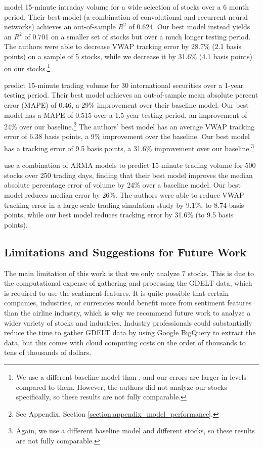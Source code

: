 \documentclass[12pt]{article}
\begin{document}
\textcite{cucuringu2025forecasting} model 15-minute intraday volume for a wide selection of stocks over a 6 month period. Their best model (a combination of convolutional and recurrent neural networks) achieves an out-of-sample $R^2$ of 0.624. Our best model instead yields an $R^2$ of 0.701 on a smaller set of stocks but over a much longer testing period. The authors were able to decrease VWAP tracking error by 28.7\% (2.1 basis points) on a sample of 5 stocks, while we decrease it by 31.6\% (4.1 basis points) on our stocks.\footnote{We use a different baseline model than \textcite{cucuringu2025forecasting}, and our errors are larger in levels compared to them. However, the authors did not analyze our stocks specifically, so these results are not fully comparable.}

\textcite{chen2016forecasting} predict 15-minute trading volume for 30 international securities over a 1-year testing period. Their best model achieves an out-of-sample mean absolute percent error (MAPE) of 0.46, a 29\% improvement over their baseline model. Our best model has a MAPE of 0.515 over a 1.5-year testing period, an improvement of 24\% over our baseline.\footnote{See Appendix, Section \ref{section:appendix_model_performance}.} The authors' best model has an average VWAP tracking error of 6.38 basis points, a 9\% improvement over the baseline. Our best model has a tracking error of 9.5 basis points, a 31.6\% improvement over our baseline.\footnote{Again, we use a different baseline model and different stocks, so these results are not fully comparable.}

\textcite{satish2014predicting} use a combination of ARMA models to predict 15-minute trading volume for 500 stocks over 250 trading days, finding that their best model improves the median absolute percentage error of volume by 24\% over a baseline model. Our best model reduces median error by 26\%. The authors were able to reduce VWAP tracking error in a large-scale trading simulation study by 9.1\%, to 8.74 basis points, while our best model reduces tracking error by 31.6\% (to 9.5 basis points).

\subsection{Limitations and Suggestions for Future Work}
The main limitation of this work is that we only analyze 7 stocks. This is due to the computational expense of gathering and processing the GDELT data, which is required to use the sentiment features. It is quite possible that certain companies, industries, or currencies would benefit more from sentiment features than the airline industry, which is why we recommend future work to analyze a wider variety of stocks and industries. Industry professionals could substantially reduce the time to gather GDELT data by using Google BigQuery to extract the data, but this comes with cloud computing costs on the order of thousands to tens of thousands of dollars.
\end{document}
